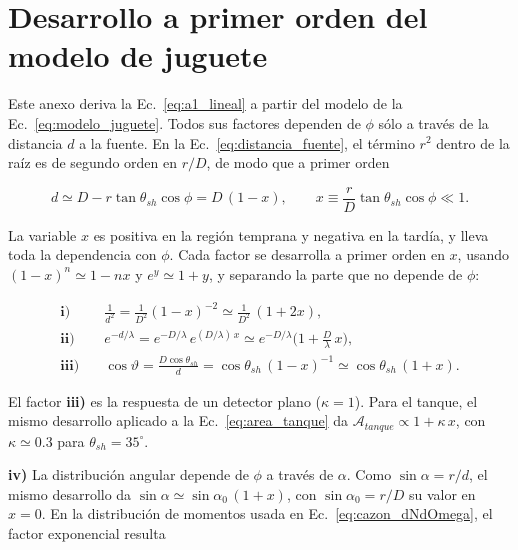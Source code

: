 



\chapter{Desarrollo a primer orden del modelo de juguete}
\label{anexo:linealizacion}

Este anexo deriva la Ec.~\ref{eq:a1_lineal} a partir del modelo de la Ec.~\ref{eq:modelo_juguete}. Todos sus factores dependen de $\phi$ sólo a través de la distancia $d$ a la fuente. En la Ec.~\ref{eq:distancia_fuente}, el término $r^2$ dentro de la raíz es de segundo orden en $r/D$, de modo que a primer orden

\begin{equation}
	d \simeq D - r\tan\theta_{sh}\cos\phi = D\,(1 - x),
	\qquad x \equiv \frac{r}{D}\tan\theta_{sh}\cos\phi \ll 1 .
	\nonumber
\end{equation}

La variable $x$ es positiva en la región temprana y negativa en la tardía, y lleva toda la dependencia con $\phi$. Cada factor se desarrolla a primer orden en $x$, usando $(1-x)^n \simeq 1-nx$ y $e^{y}\simeq 1+y$, y separando la parte que no depende de $\phi$:

\begin{align}
	\textbf{i)}\quad & \frac{1}{d^2} = \frac{1}{D^2}(1-x)^{-2} \simeq \frac{1}{D^2}\,(1+2x), \nonumber\\
	\textbf{ii)}\quad & e^{-d/\lambda} = e^{-D/\lambda}\,e^{(D/\lambda)\,x} \simeq e^{-D/\lambda}\Big(1+\frac{D}{\lambda}\,x\Big), \nonumber\\
	\textbf{iii)}\quad & \cos\vartheta = \frac{D\cos\theta_{sh}}{d} = \cos\theta_{sh}\,(1-x)^{-1} \simeq \cos\theta_{sh}\,(1+x). \nonumber
\end{align}

El factor \textbf{iii)} es la respuesta de un detector plano ($\kappa=1$). Para el tanque, el mismo desarrollo aplicado a la Ec.~\ref{eq:area_tanque} da $\mathcal{A}_{tanque}\propto 1+\kappa\,x$, con $\kappa\simeq0.3$ para $\theta_{sh}=35^\circ$.

\textbf{iv)} La distribución angular depende de $\phi$ a través de $\alpha$. Como $\sin\alpha = r/d$, el mismo desarrollo da $\sin\alpha \simeq \sin\alpha_0\,(1+x)$, con $\sin\alpha_0 = r/D$ su valor en $x=0$. En la distribución de momentos usada en Ec.~\ref{eq:cazon_dNdOmega}, el factor exponencial resulta

